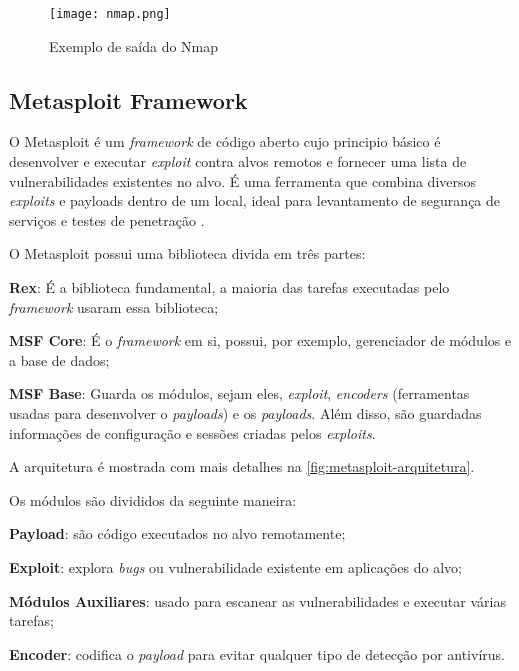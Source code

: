  \begin{figure}[htb]
  \centering
  \caption{Exemplo de saída do Nmap}
  \texttt{[image: nmap.png]}
  \label{fig:nmap-exemplo}
 \end{figure}

\subsection{Metasploit Framework} \label{sec:metasploit}

O Metasploit é um \textit{framework} de código aberto cujo principio básico é desenvolver e executar \textit{exploit} contra alvos remotos e fornecer uma lista de vulnerabilidades existentes no alvo. É uma ferramenta que combina diversos \textit{exploits} e payloads dentro de um local, ideal para levantamento de segurança de serviços e testes de penetração \cite{metasploit:yash}.  

O Metasploit possui uma biblioteca divida em três partes:

\begin{alineas}
\item \textbf{Rex}: É a biblioteca fundamental, a maioria das tarefas executadas pelo \textit{framework} usaram essa biblioteca; 
\item \textbf{MSF Core}: É o \textit{framework} em si, possui, por exemplo, gerenciador de módulos e a base de dados; 
\item \textbf{MSF Base}: Guarda os módulos, sejam eles, \textit{exploit}, \textit{encoders} (ferramentas usadas para desenvolver o \textit{payloads}) e os \textit{payloads}. Além disso, são guardadas informações de configuração e sessões criadas pelos \textit{exploits}. 
\end{alineas}

A arquitetura é mostrada com mais detalhes na \autoref{fig:metasploit-arquitetura}. 

Os módulos são divididos da seguinte maneira: 

\begin{alineas}
\item \textbf{Payload}: são código executados no alvo remotamente; 
\item \textbf{Exploit}: explora \textit{bugs} ou vulnerabilidade existente em aplicações do alvo; 
\item \textbf{Módulos Auxiliares}: usado para escanear as vulnerabilidades e executar várias tarefas; 
\item \textbf{Encoder}: codifica o \textit{payload} para evitar qualquer tipo de detecção por antivírus.
\end{alineas}

